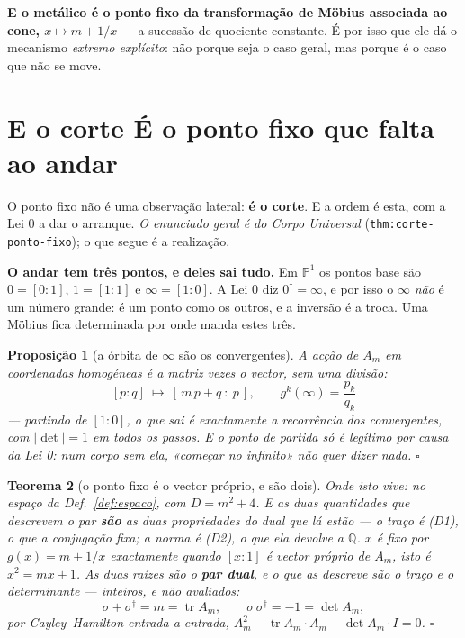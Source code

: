 \documentclass[11pt,a4paper]{article}
\newtheorem{teorema}{Teorema}
\newtheorem{proposicao}[teorema]{Proposição}
\newcommand{\code}[1]{\texttt{\small #1}}
\newcommand{\abs}[1]{\lvert #1\rvert}
\newcommand{\dg}{^{\dagger}}
\begin{document}
\noindent\textbf{E o metálico é o ponto fixo da
transformação de Möbius associada ao cone, $x\mapsto m+1/x$} --- a sucessão de quociente
constante. É por isso que ele dá o mecanismo \emph{extremo explícito}: não porque
seja o caso geral, mas porque é o caso que não se move.

\section{E o corte É o ponto fixo que falta ao andar}\label{sec:pontofixo}

\noindent O ponto fixo não é uma observação lateral: \textbf{é o corte}. E a ordem
é esta, com a Lei 0 a dar o arranque. \emph{O enunciado geral é do Corpo Universal}
(\code{thm:corte-ponto-fixo}); o que segue é a realização.

\medskip
\noindent\textbf{O andar tem três pontos, e deles sai tudo.} Em $\mathbb{P}^1$ os
pontos base são $0=[0:1]$, $1=[1:1]$ e $\infty=[1:0]$. A Lei 0 diz $0\dg=\infty$, e
por isso o $\infty$ \emph{não} é um número grande: é um ponto como os outros, e a
inversão é a troca. Uma Möbius fica determinada por onde manda estes três.

\begin{proposicao}[a órbita de $\infty$ são os convergentes]\label{prop:orbita}
A acção de $A_m$ em coordenadas homogéneas é a matriz vezes o vector, \emph{sem uma
divisão}:
\[
\boxed{\;[p:q]\ \longmapsto\ [\,m\,p+q\ :\ p\,],
\qquad
g^{k}(\infty)=\frac{p_k}{q_k}\;}
\]
--- partindo de $[1:0]$, o que sai é exactamente a recorrência dos convergentes, com
$\abs{\det}=1$ em todos os passos. \emph{E o ponto de partida só é legítimo por causa
da Lei 0}: num corpo sem ela, «começar no infinito» não quer dizer nada. $\square$
\end{proposicao}

\begin{teorema}[o ponto fixo é o vector próprio, e são dois]\label{thm:fixo-dual}
\emph{Onde isto vive:} no espaço da Def.~\ref{def:espaco}, com $D=m^{2}+4$. E as duas
quantidades que descrevem o par \textbf{são} as duas propriedades do dual que lá estão ---
o traço é (D1), o que a conjugação fixa; a norma é (D2), o que ela devolve a $\mathbb{Q}$.
$x$ é fixo por $g(x)=m+1/x$ exactamente quando $[x:1]$ é vector próprio de $A_m$,
isto é $x^{2}=mx+1$. As duas raízes são o \textbf{par dual}, e o que as descreve são
o traço e o determinante --- \emph{inteiros}, e não avaliados:
\[
\sigma+\sigma\dg=m=\operatorname{tr}A_m,
\qquad
\sigma\,\sigma\dg=-1=\det A_m ,
\]
por Cayley--Hamilton entrada a entrada, $A_m^{2}-\operatorname{tr}A_m\cdot A_m+\det
A_m\cdot I=0$. $\square$
\end{teorema}
\end{document}
